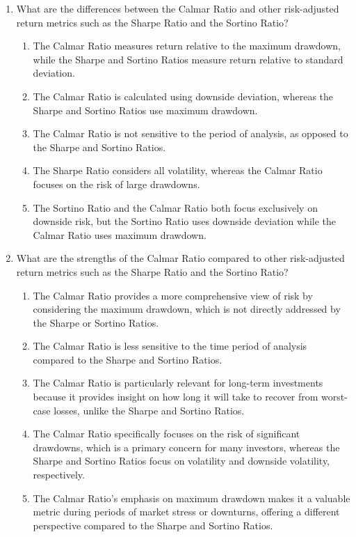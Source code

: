 \documentclass{article}
\begin{document}
\begin{enumerate}

    \item What are the differences between the Calmar Ratio and other risk-adjusted return metrics such as the Sharpe Ratio and the Sortino Ratio?
    \begin{enumerate}
        \item The Calmar Ratio measures return relative to the maximum drawdown, while the Sharpe and Sortino Ratios measure return relative to standard deviation.
        \item The Calmar Ratio is calculated using downside deviation, whereas the Sharpe and Sortino Ratios use maximum drawdown.
        \item The Calmar Ratio is not sensitive to the period of analysis, as opposed to the Sharpe and Sortino Ratios.
        \item The Sharpe Ratio considers all volatility, whereas the Calmar Ratio focuses on the risk of large drawdowns.
        \item The Sortino Ratio and the Calmar Ratio both focus exclusively on downside risk, but the Sortino Ratio uses downside deviation while the Calmar Ratio uses maximum drawdown.
    \end{enumerate}

    \item What are the strengths of the Calmar Ratio compared to other risk-adjusted return metrics such as the Sharpe Ratio and the Sortino Ratio?
    \begin{enumerate}
        \item The Calmar Ratio provides a more comprehensive view of risk by considering the maximum drawdown, which is not directly addressed by the Sharpe or Sortino Ratios.
        \item The Calmar Ratio is less sensitive to the time period of analysis compared to the Sharpe and Sortino Ratios.
        \item The Calmar Ratio is particularly relevant for long-term investments because it provides insight on how long it will take to recover from worst-case losses, unlike the Sharpe and Sortino Ratios.
        \item The Calmar Ratio specifically focuses on the risk of significant drawdowns, which is a primary concern for many investors, whereas the Sharpe and Sortino Ratios focus on volatility and downside volatility, respectively.
        \item The Calmar Ratio's emphasis on maximum drawdown makes it a valuable metric during periods of market stress or downturns, offering a different perspective compared to the Sharpe and Sortino Ratios.
    \end{enumerate}


\end{enumerate}
\end{document}
